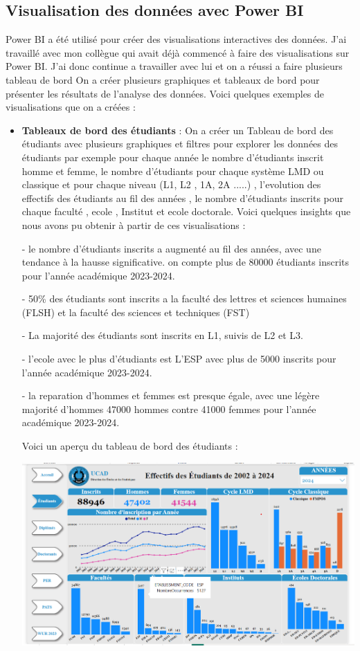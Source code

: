 \subsection{Visualisation des données avec Power BI}  
Power BI a été utilisé pour créer des visualisations interactives des données. J'ai travaillé avec mon collègue qui avait déjà commencé à faire des visualisations sur Power BI. J'ai donc continue a travailler avec lui et on a réussi a faire plusieurs tableau de bord 
On a  créer plusieurs graphiques et tableaux de bord pour présenter les résultats de l'analyse des données. Voici quelques exemples de visualisations que on a  créées : 
\begin{itemize}
    \item \textbf{Tableaux de bord des étudiants } : On a créer un Tableau de bord  des étudiants avec plusieurs graphiques et filtres pour explorer les données des étudiants par exemple pour chaque année le nombre d'étudiants inscrit homme et femme, le nombre d'étudiants pour chaque système LMD ou classique et pour chaque niveau (L1, L2 , 1A, 2A .....) , l'evolution des effectifs des étudiants au fil des années , le nombre d'étudiants inscrits pour chaque faculté , ecole , Institut et ecole doctorale. Voici quelques insights que nous avons pu obtenir à partir de ces visualisations : 
    
    - le nombre d'étudiants inscrits a augmenté au fil des années, avec une tendance à la hausse significative. on compte plus de 80000 étudiants inscrits pour l'année académique 2023-2024. 

    - 50\% des étudiants sont inscrits a la faculté des lettres et sciences humaines (FLSH) et la faculté des sciences et techniques (FST) 

    - La majorité des étudiants sont inscrits en L1, suivis de L2 et L3. 
    
    - l'ecole avec le plus d'étudiants  est L'ESP avec plus de 5000  inscrits pour l'année académique 2023-2024.

    - la reparation d'hommes et femmes est presque égale, avec 
    une légère majorité d'hommes 47000 hommes contre 41000 femmes pour l'année académique 2023-2024. 

    Voici un aperçu du tableau de bord des étudiants :
    
    \begin{center}
    \includegraphics[width=1\textwidth]{image/etudiants.png} 
    \end{center}



\end{itemize}
